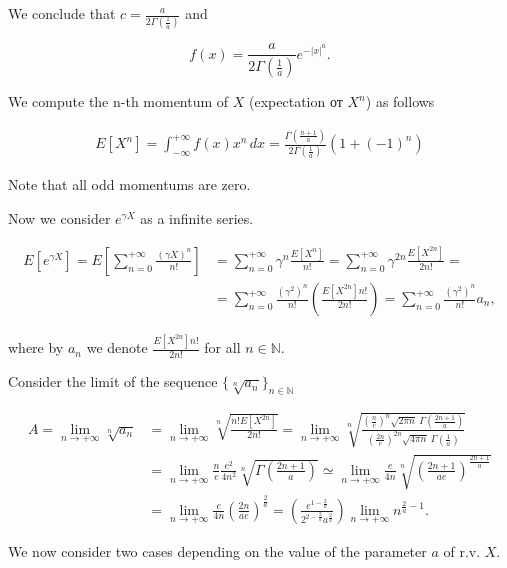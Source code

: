\documentclass[12pt, a4paper]{article}
\theoremstyle{remark}
\newcommand{\expx}[1]{e^{-|x|^{#1}}}
\newcommand{\infint}[1]{\int_{-\infty}^{+\infty} #1 \, dx}
\begin{document}
We conclude that $c = \frac{a}{2\Gamma(\frac{1}{a})}
$ and

$$f(x) = \frac{a}{2\Gamma(\frac{1}{a})} \expx{a}.$$

We compute the n-th momentum of $X$ (expectation от $X^n$) as follows

\begin{align*}
    E[X^n] = \infint{f(x) x^n} = \frac{\Gamma(\frac{n + 1}{a})}{2\Gamma(\frac{1}{a})} (1 + (-1)^n)
\end{align*}

Note that all odd momentums are zero. 

Now we consider $e^{\gamma X}$ as a infinite series.

\begin{align*}
    E[e^{\gamma X}] = E\left[\sum_{n = 0}^{+\infty}\frac{(\gamma X)^n}{n!}\right] & = \sum_{n = 0}^{+\infty}\gamma^n\frac{E[X^n]}{n!} = \sum_{n = 0}^{+\infty}\gamma^{2n}\frac{E[X^{2n}]}{2n!} =                                \\
    & = \sum_{n = 0}^{+\infty}\frac{(\gamma^2)^{n}}{n!}\left(\frac{E[X^{2n}]n!}{2n!}\right) = \sum_{n = 0}^{+\infty}\frac{(\gamma^2)^{n}}{n!} a_n,
\end{align*}

where by $a_n$ we denote $\frac{E[X^{2n}]n!}{2n!}$ for all $n \in \mathbb{N}$.

Consider the limit of the sequence $\{\sqrt[n]{a_n}\}_{n \in \mathbb{N}}$

\begin{align*}
    A = \lim_{n \to +\infty} \sqrt[n]{a_n} & = \lim_{n \to +\infty} \sqrt[n]{\frac{n! E[X^{2n}]}{2n!}} =
    \lim_{n \to +\infty} \sqrt[n]{
        \frac{
            \left(\frac{n}{e}\right)^n \sqrt{2\pi n} \
            \Gamma\left(\frac{2n + 1}{a}\right)}{
            \left(\frac{2n}{e}\right)^{2n} \sqrt{4\pi n}\ \Gamma\left(\frac{1}{a}\right)}
    } \\
    & = \lim_{n \to +\infty} \frac{n}{e} \frac{e^2}{4n^2} \sqrt[n]{\Gamma\left(\frac{2n + 1}{a}\right)} \simeq \lim_{n \to +\infty}  \frac{e}{4n} \sqrt[n]{\left(\frac{2n + 1}{ae}\right)^{\frac{2n + 1}{a}}} \\
    & = \lim_{n \to +\infty} \frac{e}{4n} \left(\frac{2n}{ae}\right)^{\frac{2}{a}} = \left(\frac{e^{1 - \frac{2}{a}}}{2^{2 - \frac{2}{a}} a^\frac{2}{a}}\right) \lim_{n \to +\infty} n^{\frac{2}{a} - 1}.
\end{align*}

We now consider two cases depending on the value of the parameter $a$ of r.v. \(X\).
\end{document}
